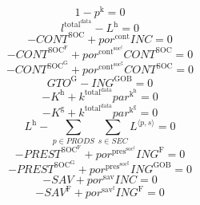 \begin{equation}
1 - p^{\mathrm{k}} = 0
\end{equation}
\begin{equation}
l^{\mathrm{total}^{\mathrm{data}}} - L^{\mathrm{h}} = 0
\end{equation}
\begin{equation}
-{C\!O\!N\!T}^{\mathrm{SOC}} + {{p\!o\!r}^{\mathrm{cont}}} {{I\!N\!C}} = 0
\end{equation}
\begin{equation}
-{C\!O\!N\!T}^{\mathrm{SOC}^{\mathrm{F}}} + {{p\!o\!r}^{\mathrm{cont}^{\mathrm{soc}^{\mathrm{f}}}}} {{C\!O\!N\!T}^{\mathrm{SOC}}} = 0
\end{equation}
\begin{equation}
-{C\!O\!N\!T}^{\mathrm{SOC}^{\mathrm{G}}} + {{p\!o\!r}^{\mathrm{cont}^{\mathrm{soc}^{\mathrm{g}}}}} {{C\!O\!N\!T}^{\mathrm{SOC}}} = 0
\end{equation}
\begin{equation}
{G\!T\!O}^{\mathrm{G}} - {I\!N\!G}^{\mathrm{GOB}} = 0
\end{equation}
\begin{equation}
-K^{\mathrm{h}} + {k^{\mathrm{total}^{\mathrm{data}}}} {{p\!a\!r}^{\mathrm{k}^{\mathrm{h}}}} = 0
\end{equation}
\begin{equation}
-K^{\mathrm{g}} + {k^{\mathrm{total}^{\mathrm{data}}}} {{p\!a\!r}^{\mathrm{k}^{\mathrm{g}}}} = 0
\end{equation}
\begin{equation}
L^{\mathrm{h}} - \sum_{p\in {P\!R\!O\!D\!S}} \sum_{s\in {S\!E\!C}} {L}^{\langle p,s\rangle} = 0
\end{equation}
\begin{equation}
-{P\!R\!E\!S\!T}^{\mathrm{SOC}^{\mathrm{F}}} + {{p\!o\!r}^{\mathrm{pres}^{\mathrm{soc}^{\mathrm{f}}}}} {{I\!N\!G}^{\mathrm{F}}} = 0
\end{equation}
\begin{equation}
-{P\!R\!E\!S\!T}^{\mathrm{SOC}^{\mathrm{G}}} + {{p\!o\!r}^{\mathrm{pres}^{\mathrm{soc}^{\mathrm{g}}}}} {{I\!N\!G}^{\mathrm{GOB}}} = 0
\end{equation}
\begin{equation}
-{S\!A\!V} + {{p\!o\!r}^{\mathrm{sav}}} {{I\!N\!C}} = 0
\end{equation}
\begin{equation}
-{S\!A\!V}^{\mathrm{F}} + {{p\!o\!r}^{\mathrm{sav}^{\mathrm{f}}}} {{I\!N\!G}^{\mathrm{F}}} = 0
\end{equation}
